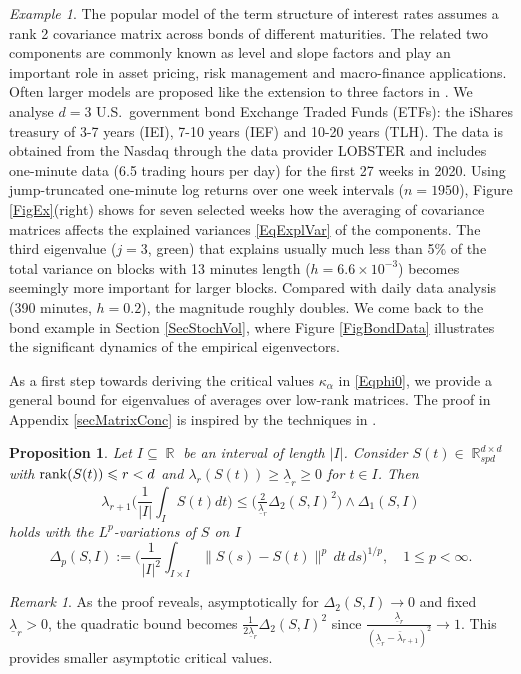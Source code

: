 \documentclass[preprint,aos]{imsart}
\numberwithin{equation}{section}
\newtheorem{proposition}[satz]{Proposition}
\theoremstyle{remark}
\newtheorem{remark}[satz]{Remark}
\newtheorem{example}[satz]{Example}
\DeclareMathOperator{\R}{{\mathbb R}}
\renewcommand{\subset}{\subseteq}
\providecommand{\abs}[1]{\lvert #1 \rvert}
\providecommand{\norm}[1]{\lVert #1 \rVert}
\renewcommand{\le}{\leqslant}
\renewcommand{\ge}{\geqslant}
\begin{document}
\begin{example}\label{ExEmpirical}
The popular \cite{NS87} model of the term structure of interest rates assumes a rank 2 covariance matrix across bonds of different maturities. The related two components are commonly known as level and slope factors and play an important role in asset pricing, risk management and macro-finance applications. Often larger models are proposed like the extension to three factors in \cite{DL06}.
We analyse $d=3$ U.S.\ government bond Exchange Traded Funds (ETFs): the iShares treasury of 3-7 years  (IEI), 7-10 years (IEF) and 10-20 years (TLH). The data is obtained from the Nasdaq through the data provider LOBSTER and includes one-minute data (6.5 trading hours per day) for the first 27 weeks in 2020. Using jump-truncated one-minute log returns over one week intervals ($n=1950$), Figure \ref{FigEx}(right) shows for seven selected weeks how the averaging of covariance matrices affects the  explained variances \eqref{EqExplVar} of the components. The third eigenvalue ($j=3$, green) that explains usually much less than 5\% of the total variance on blocks with 13 minutes length ($h=6.6\times10^{-3}$) becomes seemingly more important for larger blocks. Compared with daily data analysis (390 minutes, $h=0.2$), the magnitude roughly doubles.
We come back to the bond example in Section \ref{SecStochVol}, where Figure \ref{FigBondData} illustrates the significant dynamics of the empirical eigenvectors.
\end{example}
As a first step towards deriving the critical values $\kappa_\alpha$ in \eqref{Eqphi0}, we provide a general bound for eigenvalues of averages over low-rank matrices.  The proof in Appendix \ref{secMatrixConc} is inspired by the techniques in \citet{reiss2020}.

\begin{proposition}\label{PropPerturb}
Let $I\subset\R$ be an interval of length $\abs{I}$. Consider $S(t)\in \R^{d\times d}_{spd}$ with $\rank(S(t))\le r<d$ and $\lambda_r(S(t))\ge\underline\lambda_r\ge 0$ for $t\in I$. Then
\[ \lambda_{r+1}\Big(\frac1{\abs{I}}\int_I S(t)dt\Big) \le \big(\tfrac{2}{\underline\lambda_r}\Delta_2(S,I)^2\big)\wedge \Delta_1(S,I)\]
holds with the $L^p$-variations of $S$ on $I$
\[ \Delta_p(S,I):=\Big(\frac1{\abs{I}^2}\int_{I\times I} \norm{S(s)-S(t)}^p\,dt\,ds\Big)^{1/p},\quad 1\le p<\infty.
\]
\end{proposition}

\begin{remark}
As the proof reveals, asymptotically for $\Delta_2(S,I)\to 0$ and fixed $\underline\lambda_r>0$, the quadratic bound becomes $\frac1{2\underline\lambda_r}\Delta_2(S,I)^2$ since $\frac{\underline\lambda_r}{(\underline\lambda_r-\bar \lambda_{r+1})^2}\to 1$. This provides smaller asymptotic critical values.
\end{remark}
\end{document}

